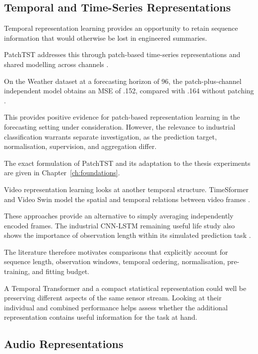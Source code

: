 \subsection{Temporal and Time-Series Representations}

Temporal representation learning provides an opportunity to retain sequence information that would
otherwise be lost in engineered summaries.

PatchTST addresses this through patch-based time-series representations and shared modelling across
channels \parencite[Sections~3.1--3.2]{Nie2023PatchTST}.

On the Weather dataset at a forecasting horizon of 96, the patch-plus-channel independent model
obtains an MSE of .152, compared with .164 without patching \parencite[Table~7]{Nie2023PatchTST}.

This provides positive evidence for patch-based representation learning in the forecasting setting
under consideration. However, the relevance to industrial classification warrants separate
investigation, as the prediction target, normalisation, supervision, and aggregation differ.

The exact formulation of PatchTST and its adaptation to the thesis experiments are given in
Chapter~\ref{ch:foundations}.

Video representation learning looks at another temporal structure. TimeSformer and Video Swin model
the spatial and temporal relations between video frames \parencite{P034,P013}.

These approaches provide an alternative to simply averaging independently encoded frames. The
industrial CNN-LSTM remaining useful life study also shows the importance of observation length
within its simulated prediction task \parencite{AlDulaimi2019A}.

The literature therefore motivates comparisons that explicitly account for sequence length,
observation windows, temporal ordering, normalisation, pre-training, and fitting budget.

A Temporal Transformer and a compact statistical representation could well be preserving different
aspects of the same sensor stream. Looking at their individual and combined performance helps assess
whether the additional representation contains useful information for the task at hand.

\subsection{Audio Representations}

